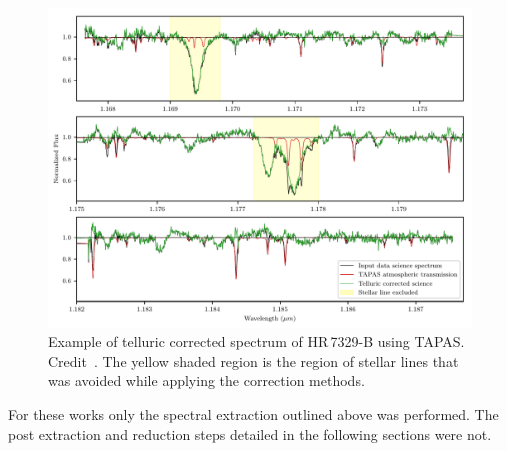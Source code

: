 \begin{figure}
    \centering
    \includegraphics[width=0.7\linewidth]{figures/reduction/ulmermol2018_tell_corr_CRIRES_48}
    \caption{Example of telluric corrected spectrum of {HR\,7329-B} using {TAPAS}.
Credit~\citet[][]{ulmer-moll_telluric_2018}.
The yellow shaded region is the region of stellar lines that was avoided while applying the correction methods.}
    \label{fig:ulmermol2018tellcorrcrires48}
\end{figure}

For these works only the spectral extraction outlined above was performed.
The post extraction and reduction steps detailed in the following sections were not.


